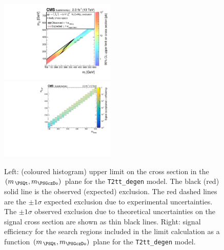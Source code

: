 \clearpage
\begin{figure}[!h]
  \begin{center}
    \includegraphics[width=0.49\textwidth]{RA1T2-4bdXSEC_aux} \, 
    \includegraphics[width=0.49\textwidth]{T2-4bd_merging_4_cats_aux} \,     
  \end{center}
  \caption{Left: (coloured histogram) upper limit on the cross section in the $(m_{\,\PSQt}, m_{\PSGczDo})$ plane for the \texttt{T2tt\_degen} model. 
  The black (red) solid line is the observed (expected) exclusion. The red dashed lines are the $\pm1\sigma$ expected exclusion due to experimental uncertainties. 
  The $\pm1\sigma$ observed exclusion due to theoretical uncertainties on the signal cross section are shown as thin black lines. 
  Right: signal efficiency for the search regions included in the limit calculation as a function $(m_{\,\PSQt}, m_{\PSGczDo})$ plane for the \texttt{T2tt\_degen} model. 
  \label{fig:T2-4bd_excl}}
\end{figure}


